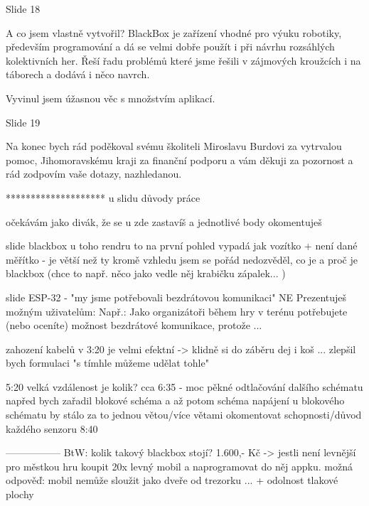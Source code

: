 Slide 18

A co jsem vlastně vytvořil? 
BlackBox je zařízení vhodné pro výuku robotiky, především programování a dá se velmi dobře použít i při návrhu rozsáhlých 
kolektivních her. Řeší řadu problémů které jsme řešili v zájmových kroužcích i na táborech a dodává i něco navrch.

Vyvinul jsem úžasnou věc s množstvím aplikací. 


Slide 19

Na konec bych rád poděkoval svému školiteli Miroslavu Burdovi za vytrvalou pomoc, Jihomoravskému kraji za finanční 
podporu a vám děkuji za pozornost a rád zodpovím vaše dotazy, nazhledanou.


********************
u slidu důvody práce 

očekávám jako divák, že se u zde zastavíš a jednotlivé body okomentuješ 


slide blackbox 
u toho rendru to na první pohled vypadá jak vozítko + není dané měřítko - je větší než ty 
kromě vzhledu jsem se pořád nedozvěděl, co je a proč je blackbox 
(chce to např. něco jako vedle něj krabičku zápalek... ) 


slide ESP-32 - "my jsme potřebovali bezdrátovou komunikaci" 
NE 
Prezentuješ možným uživatelům: 
Např.: Jako organizátoři během hry v terénu potřebujete (nebo oceníte) 
možnost bezdrátové komunikace, protože ... 


zahození kabelů v 3:20 je velmi efektní -> klidně si do záběru dej i koš ... 
zlepšil bych formulaci "s tímhle můžeme udělat tohle" 

5:20 velká vzdálenost je kolik? 
cca 6:35 - moc pěkné odtlačování dalšího schématu 
napřed bych zařadil blokové schéma a až potom schéma napájení 
u blokového schématu by stálo za to jednou větou/více větami okomentovat schopnosti/důvod každého senzoru 
8:40  

-----------------
BtW: kolik takový blackbox stojí? 1.600,- Kč -> jestli není levnější 
pro městkou hru koupit 20x levný mobil a naprogramovat do něj appku.    
možná odpověď: mobil nemůže sloužit jako dveře od trezorku ...  + odolnost tlakové plochy 
